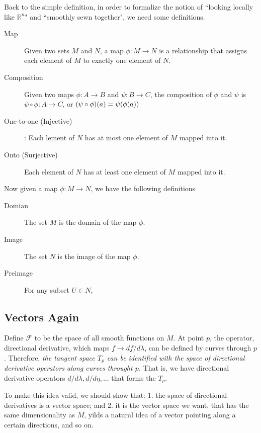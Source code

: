 \documentclass[11pt]{article}
\theoremstyle{definition}
\numberwithin{equation}{section}
\begin{document}
Back to the simple definition, in order to formalize the notion of ``looking locally like $\mathbb{R}^n$" and ``smoothly sewn together", we need some definitions.
\begin{description}
    \item[Map] Given two sets $M$ and $N$, a map $\phi: M \rightarrow N$ is a relationship that assigns each element of $M$ to exactly one element of $N$.
    \item[Composition] Given two maps $\phi: A\rightarrow B$ and $\psi: B\rightarrow C$, the composition of $\phi$ and $\psi$ is $\psi \circ \phi : A\rightarrow C$, or $\qty(\psi \circ\phi)(a)=\psi(\phi(a))$
    \item[One-to-one (Injective)]: Each lement of $N$ has at most one element of $M$ mapped into it.
    \item[Onto (Surjective)] Each element of $N$ has at least one element of $M$ mapped into it.   
\end{description}

Now given a map $\phi: M\rightarrow N$, we have the following definitions
\begin{description}
    \item[Domian] The set $M$ is the domain of the map $\phi$.
    \item[Image] The set $N$ is the image of the map $\phi$. 
    \item[Preimage] For any subset $U \in N$,
\end{description}

\subsection{Vectors Again}
Define $\mathcal{F}$ to be the space of all smooth functions on $M$. At point $p$, the operator, directional derivative, which maps $f\rightarrow df/d\lambda$, can be defined by curves through $p$. Therefore, \textit{the tangent space $T_p$ can be identified with the space of directional derivative operators along curves throught $p$.} That is, we have directional derivative operators ${d/d\lambda, d/d\eta, \dots}$ that forms the $T_p$.

To make this idea valid, we should show that: 1. the space of directional derivatives is a vector space; and 2. it is the vector space we want, that has the same dimensionality as $M$, yilds a natural idea of a vector pointing along a certain directions, and so on.
\end{document}
